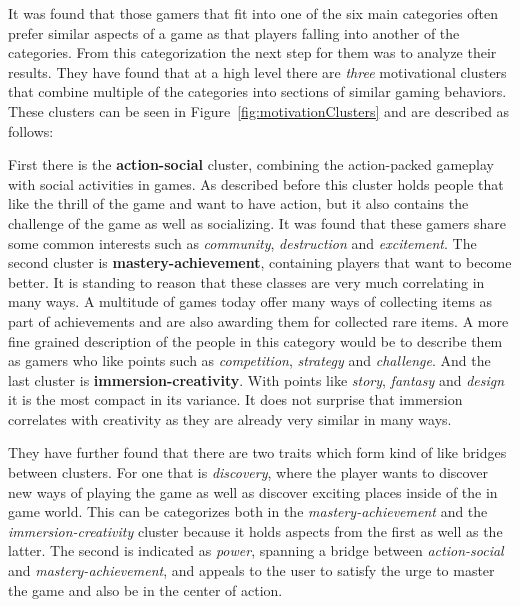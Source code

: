 It was found that those gamers that fit into one of the six main categories often prefer similar aspects of a game as that players falling into another of the categories. \newline
From this categorization the next step for them was to analyze their results. They have found that at a high level there are \textit{three} motivational clusters that combine multiple of the categories into sections of similar gaming behaviors. \newline 
These clusters can be seen in Figure~\ref{fig:motivationClusters} and are described as follows:

First there is the \textbf{action-social} cluster, combining the action-packed gameplay with social activities in games. As described before this cluster holds people that like the thrill of the game and want to have action, but it also contains the challenge of the game as well as socializing. It was found that these gamers share some common interests such as \textit{community}, \textit{destruction} and \textit{excitement}. \newline
The second cluster is \textbf{mastery-achievement}, containing players that want to become better. It is standing to reason that these classes are very much correlating in many ways. A multitude of games today offer many ways of collecting items as part of achievements and are also awarding them for collected rare items. A more fine grained description of the people in this category would be to describe them as gamers who like points such as \textit{competition}, \textit{strategy} and \textit{challenge}. \newline
And the last cluster is \textbf{immersion-creativity}. With points like \textit{story}, \textit{fantasy} and \textit{design} it is the most compact in its variance. It does not surprise that immersion correlates with creativity as they are already very similar in many ways. 

They have further found that there are two traits which form kind of like bridges between clusters. \newline
For one that is \textit{discovery}, where the player wants to discover new ways of playing the game as well as discover exciting places inside of the in game world. This can be categorizes both in the \textit{mastery-achievement} and the \textit{immersion-creativity} cluster because it holds aspects from the first as well as the latter.\newline 
The second is indicated as \textit{power}, spanning a bridge between \textit{action-social} and \textit{mastery-achievement}, and appeals to the user to satisfy the urge to master the game and also be in the center of action. 

